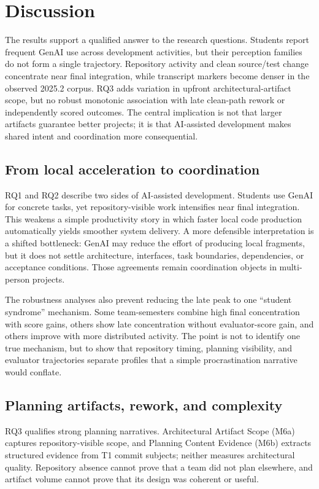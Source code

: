 \section{Discussion}
The results support a qualified answer to the research questions. Students
report frequent GenAI use across development activities, but their perception
families do not form a single trajectory. Repository activity and clean
source/test change concentrate near final integration, while transcript
markers become denser in the observed 2025.2 corpus. RQ3 adds variation in
upfront architectural-artifact scope, but no robust monotonic association with
late clean-path rework or independently scored outcomes. The central
implication is not that larger artifacts guarantee better projects; it is that
AI-assisted development makes shared intent and coordination more consequential.

\subsection{From local acceleration to coordination}

RQ1 and RQ2 describe two sides of AI-assisted development. Students use GenAI
for concrete tasks, yet repository-visible work intensifies near final
integration. This weakens a simple productivity story in which faster local
code production automatically yields smoother system delivery. A more
defensible interpretation is a shifted bottleneck: GenAI may reduce the effort
of producing local fragments, but it does not settle architecture, interfaces,
task boundaries, dependencies, or acceptance conditions. Those agreements
remain coordination objects in multi-person projects.

The robustness analyses also prevent reducing the late peak to one
``student syndrome'' mechanism. Some team-semesters combine high final
concentration with score gains, others show late concentration without
evaluator-score gain, and others improve with more distributed activity. The
point is not to identify one true mechanism, but to show that repository
timing, planning visibility, and evaluator trajectories separate profiles that
a simple procrastination narrative would conflate.

\subsection{Planning artifacts, rework, and complexity}

RQ3 qualifies strong planning narratives. Architectural Artifact Scope (M6a)
captures repository-visible scope, and Planning Content Evidence (M6b)
extracts structured evidence from T1 commit subjects; neither measures
architectural quality. Repository absence cannot prove that a team did not
plan elsewhere, and artifact volume cannot prove that its design was coherent
or useful.

